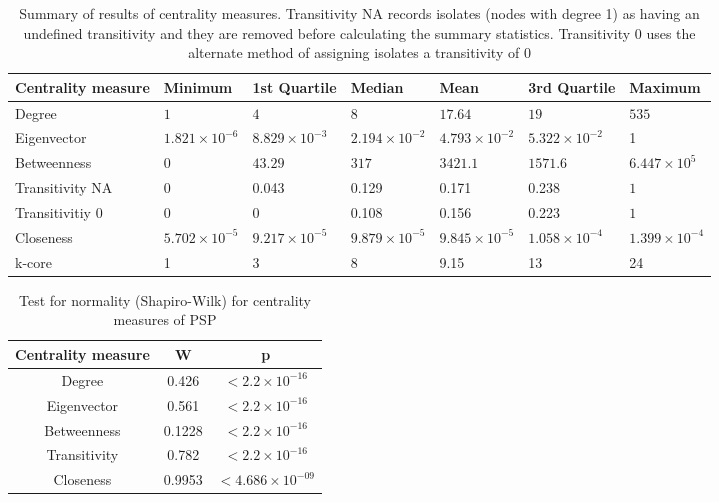 \begin{table}[ht]
\centering

\begin{tabular}{lllllll}
  \toprule
 Centrality measure & Minimum & 1st Quartile & Median & Mean & 3rd Quartile & Maximum \\ 
 \midrule
Degree & $1 $ & $4 $ & $8 $ & $17.64$  & $19$ & $535$ \\ 
  Eigenvector & $1.821 \times 10^{-6}$ & $8.829 \times 10^{-3}$ & $2.194 \times 10^{-2}$ & $4.793 \times 10^{-2}$ & $5.322 \times 10^{-2}$ & 1 \\ 
   Betweenness & $0 $ & $43.29 $ & $317 $ & $3421.1$ & $1571.6$& $6.447 \times 10^{5}$ \\ 
  Transitivity NA & 0  & 0.043 & 0.129 & 0.171 & 0.238 & $1 $ \\ 
  Transitivitiy 0 & 0  & 0 & 0.108  & 0.156  & 0.223  & $1$ \\ 
  Closeness & $5.702 \times 10^{-5}$ & $9.217 \times 10^{-5}$ & $9.879 \times 10^{-5}$ & $9.845 \times 10^{-5}$ & $1.058 \times 10^{-4}$ & $1.399 \times 10^{-4}$ \\ 
  k-core & 1 & 3 & 8 & 9.15 & 13& 24 \\ 
   \bottomrule
\end{tabular}
\caption{Summary of results of centrality measures. Transitivity NA records isolates (nodes with degree 1) as having an undefined transitivity and they are removed before calculating the summary statistics. Transitivity 0 uses the alternate method of assigning isolates a transitivity of 0} 
\label{Table:Summary of centrality measures}
\end{table}



\begin{table}[h]
    \centering
    \begin{tabular}{c|c|c}
       Centrality measure  &  W& p\\
       \hline
       
       Degree  & 0.426 & $<2.2 \times 10^{-16}$ \\
       Eigenvector &0.561  & $<2.2 \times 10^{-16}$ \\
       Betweenness &0.1228& $<2.2 \times 10^{-16}$ \\
       Transitivity &0.782 & $<2.2 \times 10^{-16}$\\
       Closeness &0.9953& $<4.686 \times 10^{-09}$\\ 
    \end{tabular}
    \caption{Test for normality (Shapiro-Wilk) for centrality measures of PSP}
    \label{Table:Test for normality (Shapiro-Wilk) for centrality measures of PSP}
\end{table}

